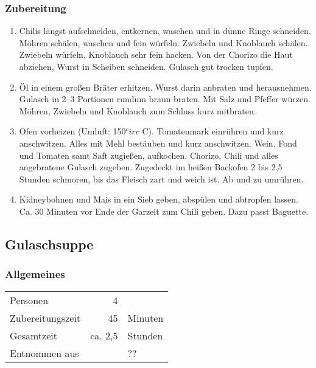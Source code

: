 \subsubsection*{Zubereitung}
\begin{enumerate}
	\item Chilis längst aufschneiden, entkernen, waschen und in dünne Ringe schneiden. Möhren schälen, waschen und fein würfeln. Zwiebeln und Knoblauch schälen. Zwiebeln würfeln, Knoblauch sehr fein hacken. Von der Chorizo die Haut abziehen, Wurst in Scheiben schneiden. Gulasch gut trocken tupfen.
	\item 	Öl in einem großen Bräter erhitzen. Wurst darin anbraten und herausnehmen. Gulasch in 2–3 Portionen rundum braun braten. Mit Salz und Pfeffer würzen. Möhren, Zwiebeln und Knoblauch zum Schluss kurz mitbraten.
	\item 	Ofen vorheizen (Umluft: 150$^circ$ C). Tomatenmark einrühren und kurz anschwitzen. Alles mit Mehl bestäuben und kurz anschwitzen. Wein, Fond und Tomaten samt Saft zugießen, aufkochen. Chorizo, Chili und alles angebratene Gulasch zugeben. Zugedeckt im heißen Backofen 2 bis 2,5 Stunden schmoren, bis das Fleisch zart und weich ist. Ab und zu umrühren.
	\item 	Kidneybohnen und Mais in ein Sieb geben, abspülen und abtropfen lassen. Ca. 30 Minuten vor Ende der Garzeit zum Chili geben. Dazu passt Baguette. 
\end{enumerate}

\subsection{Gulaschsuppe} \label{sec:Gulaschsuppe}
\subsubsection*{Allgemeines}
\begin{tabular}{lrl}
	Personen         &   4 &  \\
	Zubereitungszeit &  45 & Minuten \\
	Gesamtzeit       & ca. 2,5 & Stunden \\
	Entnommen aus    &     & ??
\end{tabular} 

